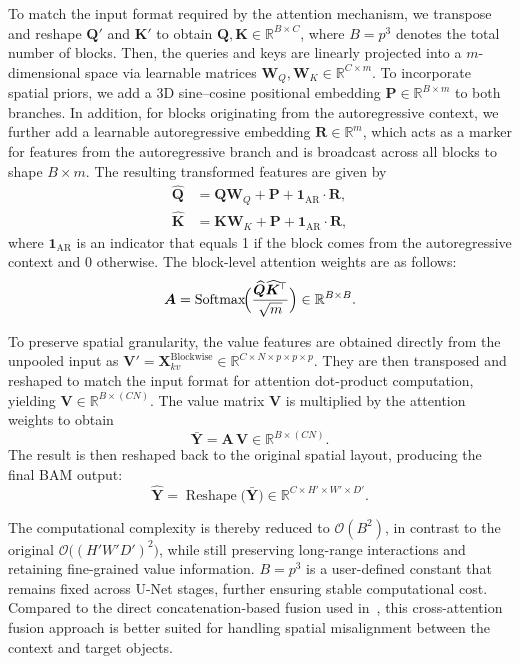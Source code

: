 To match the input format required by the attention mechanism, we transpose and reshape $\bm{Q}'$ and $\bm{K}'$ to obtain
$\bm{Q}, \bm{K} \in \mathbb{R}^{B \times C}$, where $B = p^{3}$ denotes the total number of blocks.
Then, the queries and keys are linearly projected into a $m$-dimensional space via
learnable matrices $\bm{W}_Q, \bm{W}_K \in \mathbb{R}^{C \times m}$.
To incorporate spatial priors, we add a 3D sine–cosine positional embedding
$\bm{P} \in \mathbb{R}^{B \times m}$ to both branches.
In addition, for blocks originating from the autoregressive context,
we further add a learnable autoregressive embedding
$\bm{R} \in \mathbb{R}^{m}$,
which acts as a marker for features from the autoregressive branch and is broadcast across all blocks to shape $B \times m$.
The resulting transformed features are given by
\begin{align}
\widehat{\bm{Q}} &= \bm{Q} \bm{W}_Q + \bm{P} + \bm{1}_{\text{AR}} \cdot \bm{R}, \\
\widehat{\bm{K}} &= \bm{K} \bm{W}_K + \bm{P} + \bm{1}_{\text{AR}} \cdot \bm{R},
\end{align}
where $\bm{1}_{\text{AR}}$ is an indicator that equals 1 if the block comes
from the autoregressive context and 0 otherwise. The block-level attention weights are as follows:
\begin{align}
\bm{A}=
\operatorname{Softmax}\!\Bigl(
\frac{\widehat{\bm{Q}}\widehat{\bm{K}}^{\!\top}}{\sqrt{m}}
\Bigr)\in\mathbb{R}^{B\times B}.
\end{align}

To preserve spatial granularity, the value features are obtained directly from the unpooled input as $\bm{V}' = \bm{X}_{kv}^{\text{Blockwise}} \in \mathbb{R}^{C \times N \times p \times p \times p}$. They are then transposed and reshaped to match the input format for attention dot-product computation, yielding $\bm{V} \in \mathbb{R}^{B \times (C N)}$. The value matrix $\bm{V}$ is multiplied by the attention weights to obtain
\[
\bar{\bm{Y}} = \bm{A}\,\bm{V}
      \in \mathbb{R}^{B \times (C N)}.
\]
The result is then reshaped back to the original spatial layout,
producing the final BAM output:
\[
\widehat{\bm{Y}}
  = \operatorname{Reshape}\bigl(\bar{\bm{Y}}\bigr)
  \in \mathbb{R}^{C \times H' \times W'\times D'}.
\]


The computational complexity is thereby reduced to $\mathcal{O}(B^{2})$, in contrast to the original $\mathcal{O}\!\bigl((H'W'D')^{2}\bigr)$, while still preserving long-range interactions and retaining fine-grained value information. $B = p^3$ is a user-defined constant that remains fixed across U-Net stages, further ensuring stable computational cost. Compared to the direct concatenation-based fusion used in~\cite{butoi2023universeg,czolbe2023neuralizer, hu2025building}, this cross-attention fusion approach is better suited for handling spatial misalignment between the context and target objects.


